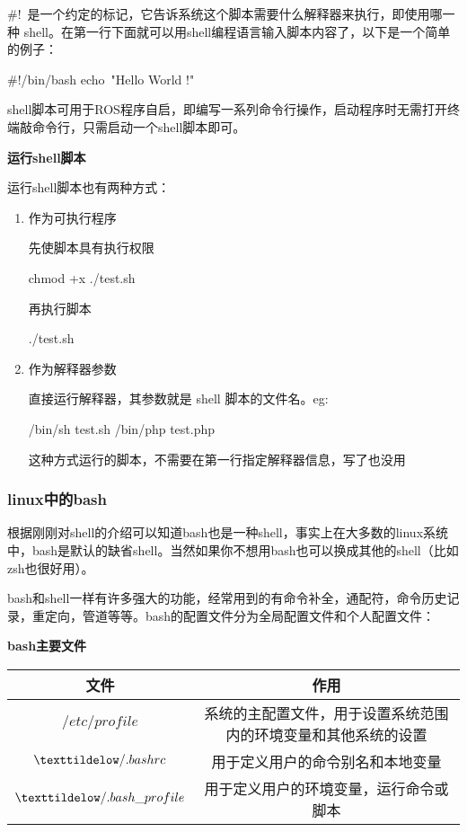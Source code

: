\#! 是一个约定的标记，它告诉系统这个脚本需要什么解释器来执行，即使用哪一种 shell。在第一行下面就可以用shell编程语言输入脚本内容了，以下是一个简单的例子：

\begin{tcode}
	#!/bin/bash
	echo "Hello World !"
\end{tcode}

shell脚本可用于ROS程序自启，即编写一系列命令行操作，启动程序时无需打开终端敲命令行，只需启动一个shell脚本即可。

\textbf{运行shell脚本}

运行shell脚本也有两种方式：

\begin{enumerate}
\item 作为可执行程序

先使脚本具有执行权限

\begin{tcode}
	chmod +x ./test.sh
\end{tcode}

再执行脚本

\begin{tcode}
	./test.sh
\end{tcode}

\item 作为解释器参数

直接运行解释器，其参数就是 shell 脚本的文件名。eg:

\begin{tcode}
	/bin/sh test.sh
	/bin/php test.php
\end{tcode}

这种方式运行的脚本，不需要在第一行指定解释器信息，写了也没用
\end{enumerate}

\subsubsection{linux中的bash}

根据刚刚对shell的介绍可以知道bash也是一种shell，事实上在大多数的linux系统中，bash是默认的缺省shell。当然如果你不想用bash也可以换成其他的shell（比如zsh也很好用）。

bash和shell一样有许多强大的功能，经常用到的有命令补全，通配符，命令历史记录，重定向，管道等等。bash的配置文件分为全局配置文件和个人配置文件：

\begin{center}
\textbf{bash主要文件}
	\begin{tabular}{cc}
		\toprule[1.5pt]
		文件 & 作用\\
		\midrule[1pt]
		$  /etc/profile    $		&系统的主配置文件，用于设置系统范围内的环境变量和其他系统的设置\\
		$  \texttildelow /.bashrc    $		&用于定义用户的命令别名和本地变量\\
		$  \texttildelow /.bash\_profile   $		&用于定义用户的环境变量，运行命令或脚本\\
		\bottomrule[1.5pt]
	\end{tabular}
\end{center}

